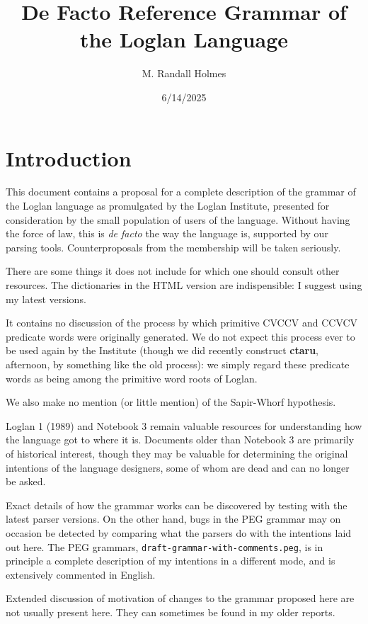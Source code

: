 \documentclass[12pt]{book}
\title{De Facto Reference Grammar of the Loglan Language}
\author{M. Randall Holmes}
\date{6/14/2025}
\begin{document}
\maketitle

\tableofcontents

\chapter{Introduction}

This document contains a proposal for a complete description of the grammar of the Loglan language as promulgated by the Loglan Institute, presented
for consideration by the small population of users of the language.  Without having the force of law, this is {\em de facto\/} the way the language is, supported by our parsing tools.   Counterproposals from the membership will be taken seriously.

There are some things it does not include for which one should consult other resources.  The dictionaries in the HTML version are indispensible:  I suggest using my latest versions.

It contains no discussion of the process by which primitive CVCCV and CCVCV predicate words were originally generated.  We do not expect this process ever to be used again by the Institute (though we did recently construct {\bf ctaru}, afternoon, by something like the old process):  we simply regard these predicate words as being among the primitive word roots of Loglan.

We also make no mention (or little mention) of the Sapir-Whorf hypothesis.

Loglan 1 (1989) and Notebook 3 remain valuable resources for understanding how the language got to where it is.   Documents older than Notebook 3 are primarily of historical interest, though they may be valuable for determining the original intentions of the language designers, some of whom are dead and can no longer be asked.

Exact details of how the grammar works can be discovered by testing with the latest parser versions.  On the other hand, bugs in the PEG grammar may on occasion be detected by comparing what the parsers do with the intentions laid out here.  The PEG grammars, {\tt draft-grammar-with-comments.peg}, is in principle a complete description of my intentions in a different mode, and is extensively commented in English.

Extended discussion of motivation of changes to the grammar proposed here are not usually present here.  They can sometimes be found in my older reports.
\end{document}
